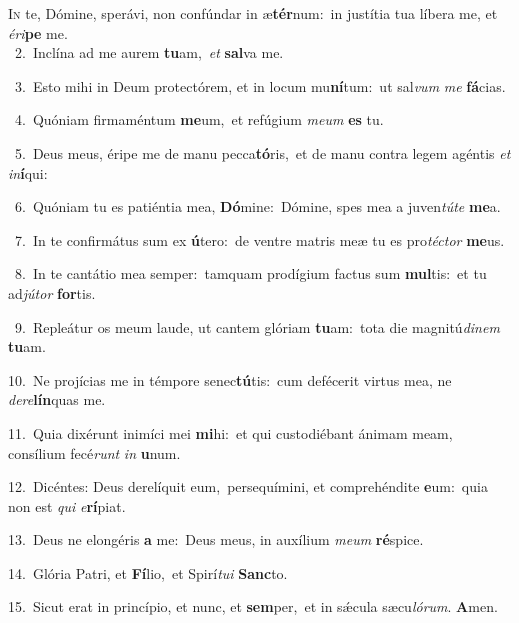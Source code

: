 \lettrine{\initial\textcolor{\initialcolor}{I}}{n} te, Dómine, sperávi, non confúndar in æ\-\textbf{tér}\-num:~\star in justítia tua líbera me, et \textit{é}\-\textit{ri}\textbf{pe} me.\\
{\numbfont\textcolor{\numbcolor}{~2.}}~Inclína ad me aurem \textbf{tu}\-am,~\star \textit{et} \textbf{sal}\-va me.\par
{\numbfont\textcolor{\numbcolor}{~3.}}~Esto mihi in Deum protectórem, et in locum mu\-\textbf{ní}\-tum:~\star ut sal\textit{vum} \textit{me} \textbf{fá}\-cias.\par
{\numbfont\textcolor{\numbcolor}{~4.}}~Quóniam firmaméntum \textbf{me}\-um,~\star et refúgium \textit{me}\-\textit{um} \textbf{es} tu.\par
{\numbfont\textcolor{\numbcolor}{~5.}}~Deus meus, éripe me de manu pecca\-\textbf{tó}\-ris,~\star et de manu contra legem agéntis \textit{et} \textit{in}\-\textbf{í}qui:\par
{\numbfont\textcolor{\numbcolor}{~6.}}~Quóniam tu es patiéntia mea, \textbf{Dó}\-mine:~\star Dómine, spes mea a juven\-\textit{tú}\-\textit{te} \textbf{me}\-a.\par
{\numbfont\textcolor{\numbcolor}{~7.}}~In te confirmátus sum ex \textbf{ú}\-tero:~\star de ventre matris meæ tu es pro\-\textit{téc}\-\textit{tor} \textbf{me}\-us.\par
{\numbfont\textcolor{\numbcolor}{~8.}}~In te cantátio mea semper:~\dagger tamquam prodígium factus sum \textbf{mul}\-tis:~\star et tu ad\-\textit{jú}\-\textit{tor} \textbf{for}\-tis.\par
{\numbfont\textcolor{\numbcolor}{~9.}}~Repleátur os meum laude, ut cantem glóriam \textbf{tu}\-am:~\star tota die magnitú\-\textit{di}\-\textit{nem} \textbf{tu}\-am.\par
{\numbfont\textcolor{\numbcolor}{10.}}~Ne projícias me in témpore senec\-\textbf{tú}\-tis:~\star cum defécerit virtus mea, ne \textit{de}\-\textit{re}\textbf{lín}quas me.\par
{\numbfont\textcolor{\numbcolor}{11.}}~Quia dixérunt inimíci mei \textbf{mi}\-hi:~\star et qui custodiébant ánimam meam, consílium fecé\textit{runt} \textit{in} \textbf{u}\-num.\par
{\numbfont\textcolor{\numbcolor}{12.}}~Dicéntes: Deus derelíquit eum,~\dagger persequímini, et comprehéndite \textbf{e}\-um:~\star quia non est \textit{qui} \textit{e}\-\textbf{rí}piat.\par
{\numbfont\textcolor{\numbcolor}{13.}}~Deus ne elongéris \textbf{a} me:~\star Deus meus, in auxílium \textit{me}\-\textit{um} \textbf{ré}\-spice.\par
{\numbfont\textcolor{\numbcolor}{14.}}~Glória Patri, et \textbf{Fí}\-lio,~\star et Spirí\-\textit{tu}\-\textit{i} \textbf{Sanc}\-to.\par
{\numbfont\textcolor{\numbcolor}{15.}}~Sicut erat in princípio, et nunc, et \textbf{sem}\-per,~\star et in sǽcula sæcu\-\textit{ló}\-\textit{rum}. \textbf{A}\-men.\par
